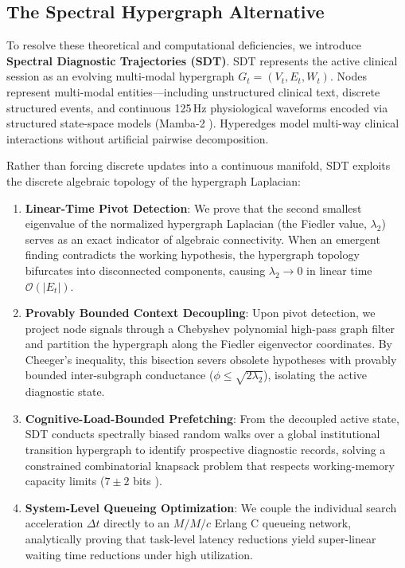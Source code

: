 \documentclass[ijds,dblanonrev]{informs4}
\begin{document}
\subsection{The Spectral Hypergraph Alternative}
To resolve these theoretical and computational deficiencies, we introduce \textbf{Spectral Diagnostic Trajectories (SDT)}. SDT represents the active clinical session as an evolving multi-modal hypergraph $G_t = (V_t, E_t, W_t)$. Nodes represent multi-modal entities---including unstructured clinical text, discrete structured events, and continuous 125\,Hz physiological waveforms encoded via structured state-space models (Mamba-2 \citep{dao2024mamba2}). Hyperedges model multi-way clinical interactions without artificial pairwise decomposition.

Rather than forcing discrete updates into a continuous manifold, SDT exploits the discrete algebraic topology of the hypergraph Laplacian:
\begin{enumerate}[(1)]
  \item \textbf{Linear-Time Pivot Detection}: We prove that the second smallest eigenvalue of the normalized hypergraph Laplacian (the Fiedler value, $\lambda_2$) serves as an exact indicator of algebraic connectivity. When an emergent finding contradicts the working hypothesis, the hypergraph topology bifurcates into disconnected components, causing $\lambda_2 \to 0$ in linear time $\mathcal{O}(|E_t|)$.
  \item \textbf{Provably Bounded Context Decoupling}: Upon pivot detection, we project node signals through a Chebyshev polynomial high-pass graph filter and partition the hypergraph along the Fiedler eigenvector coordinates. By Cheeger's inequality, this bisection severs obsolete hypotheses with provably bounded inter-subgraph conductance ($\phi \le \sqrt{2\lambda_2}$), isolating the active diagnostic state.
  \item \textbf{Cognitive-Load-Bounded Prefetching}: From the decoupled active state, SDT conducts spectrally biased random walks over a global institutional transition hypergraph to identify prospective diagnostic records, solving a constrained combinatorial knapsack problem that respects working-memory capacity limits ($7 \pm 2$ bits \citep{miller1956magical,sweller1988cognitive}).
  \item \textbf{System-Level Queueing Optimization}: We couple the individual search acceleration $\Delta t$ directly to an $M/M/c$ Erlang C queueing network, analytically proving that task-level latency reductions yield super-linear waiting time reductions under high utilization.
\end{enumerate}
\end{document}
